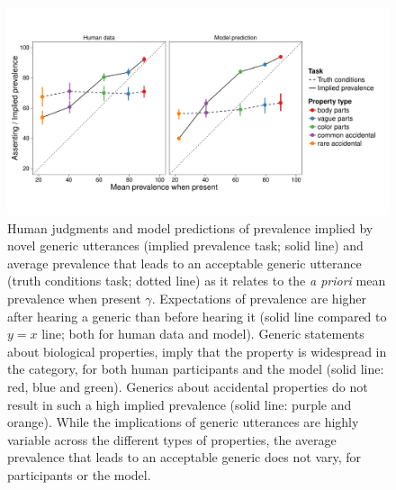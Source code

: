 \documentclass[12pt,letterpaper]{article}
\newcommand{\ndg}[1]{\textcolor{Green}{[ndg: #1]}}
\begin{document}
\begin{figure}
\centering
    \includegraphics[width=\columnwidth]{unfamiliar-asymmetry-predictive-data.pdf}
    \caption{Human judgments and model predictions of prevalence implied by novel generic utterances (implied prevalence task; solid line) and average prevalence that leads to an acceptable generic utterance (truth conditions task; dotted line) as it relates to the \emph{a priori} mean prevalence when present $\gamma$.
    Expectations of prevalence are higher after hearing a generic than before hearing it (solid line compared to $y=x$ line; both for human data and model).
    Generic statements about biological properties, imply that the property is widespread in the category, for both human participants and the model (solid line: red, blue and green). 
    Generics about accidental properties do not result in such a high implied prevalence (solid line: purple and orange).  
	While the implications of generic utterances are highly variable across the different types of properties, the average prevalence that leads to an acceptable generic does not vary, for participants or the model.
}
  \label{fig:exp2b}
\end{figure}
\end{document}
